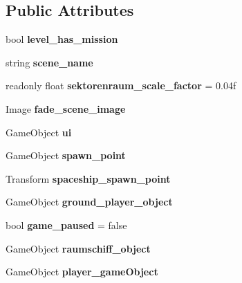 \subsection*{Public Attributes}
\begin{DoxyCompactItemize}
\item 
\mbox{\label{class_level_manager_afff88b55c30397a71549aa7b26274da3}} 
bool {\bfseries level\+\_\+has\+\_\+mission}
\item 
\mbox{\label{class_level_manager_a76878d38e02c611f287dd6b4ad12d294}} 
string {\bfseries scene\+\_\+name}
\item 
\mbox{\label{class_level_manager_a55c538ae043aef813226b712f8b606e2}} 
readonly float {\bfseries sektorenraum\+\_\+scale\+\_\+factor} = 0.\+04f
\item 
\mbox{\label{class_level_manager_a957888d8fbcf2f0e06eed58a6de2f923}} 
Image {\bfseries fade\+\_\+scene\+\_\+image}
\item 
\mbox{\label{class_level_manager_ab27e2c9177cb2ca240756088496d1a52}} 
Game\+Object {\bfseries ui}
\item 
\mbox{\label{class_level_manager_a96cc13044461a28fe3a30355756c60ef}} 
Game\+Object {\bfseries spawn\+\_\+point}
\item 
\mbox{\label{class_level_manager_a962531eda35efd57cebc72b82eb78566}} 
Transform {\bfseries spaceship\+\_\+spawn\+\_\+point}
\item 
\mbox{\label{class_level_manager_abd974d1b5d326ccd9909b487efecc306}} 
Game\+Object {\bfseries ground\+\_\+player\+\_\+object}
\item 
\mbox{\label{class_level_manager_a883489c9372d53358d5db03fbb8ae0f4}} 
bool {\bfseries game\+\_\+paused} = false
\item 
\mbox{\label{class_level_manager_a220118be37c8eb414092b279615602b9}} 
Game\+Object {\bfseries raumschiff\+\_\+object}
\item 
\mbox{\label{class_level_manager_ad64a5847ac3d6a167891ce2644cd6628}} 
Game\+Object {\bfseries player\+\_\+game\+Object}
\end{DoxyCompactItemize}
